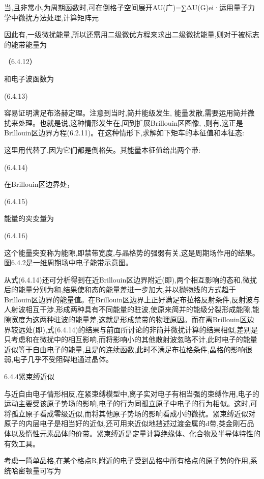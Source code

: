 当,且非常小,为周期函数时,可在倒格子空间展开AU(广)=∑ΔU(G)ei·运用量子力学中微扰方法处理,计算矩阵元



因此有,一级微扰能量,所以还需用二级微优方程来求出二级微扰能量,则对于被标志的能带能量为

	（6.4.12）

和电子波函数为

 	(6.4.13)

容易证明满足布洛赫定理。注意到当时,简并能级发生, 能量发散,需要运用简并微扰来处理。也就是说,这种情形发生在,回到扩展Brillouin区图像, ,则有,这正是Brillouin区边界方程(6.2.11)。在这种情形下,求解如下矩车的本征值和本征态:



这里用代替了,因为它们都是倒格矢。其能量本征值给出两个带: 

 (6.4.14)

在Brillouin区边界处，

 	(6.4.15)

能量的突变量为

 (6.4.16)

这个能量突变称为能隙,即禁带宽度,与晶格势的强弱有关,这是周期场作用的结果。图6.4.2是一维周期场中电子能带示意图。



从式(6.4.14)还可分析得到在近Brillouin区边界附近(即),两个相互影响的态和,微扰后的能量分别为和,结果使和态的能量差进一步加大,并以抛物线的方式趋于Brillouin区边界的能量值。在Brillouin区边界上正好满足布拉格反射条件,反射波与人射波相互干涉,形成两种具有不同能量的驻波,使原来简并的能级分裂形成能隙,能隙宽度为这两种驻波的能量差,这就是形成禁带的物理原因。而在离Brillouin区边界较远处(即),式(6.4.14)的结果与前面所讨论的非简并微扰计算的结果相似,差别是只考虑和在微扰中的相互影响,而将影响小的其他散射波忽略不计,此时电子的能量近似等于自由电子的能量,且是的连续函数,此时不满足布拉格条件,晶格的影响很弱,电子几乎不受阻碍地通过晶体。



6.4.4紧束缚近似

与近自由电子情形相反,在紧束缚模型中,离子实对电子有相当强的束缚作用,电子的运动主要受该原子势场的影响,电子的行为同孤立原子中电子的行为相似。这时,可将孤立原子看成零级近似,而将其他原子势场的影响看成小的微扰。紧束缚近似对原子的内层电子是相当好的近似,还可用来近似地挡述过渡金属的d带,类金刚石品体以及惰性元素品体的价带。紧柬缚近是定量计算绝缘体、化合物及半导体特性的有效工具。

考虑一简单品格,在某个格点R,附近的电子受到品格中所有格点的原子势的作用,系统哈密顿量可写为

